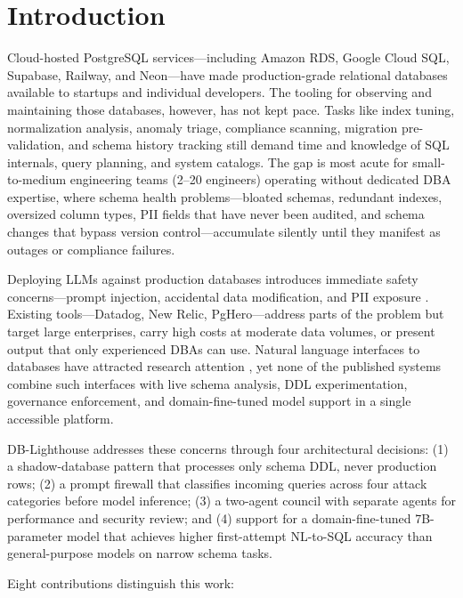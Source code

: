 \documentclass[conference]{IEEEtran}
\begin{document}
\section{Introduction}

Cloud-hosted PostgreSQL services---including Amazon RDS, Google Cloud
SQL, Supabase, Railway, and Neon---have made production-grade relational
databases available to startups and individual developers. The tooling
for observing and maintaining those databases, however, has not kept pace.
Tasks like index tuning, normalization analysis, anomaly triage, compliance
scanning, migration pre-validation, and schema history tracking still
demand time and knowledge of SQL internals, query planning,
and system catalogs. The gap is most acute for small-to-medium engineering teams (2--20
engineers) operating without dedicated DBA expertise, where schema health
problems---bloated schemas, redundant indexes, oversized column types, PII
fields that have never been audited, and schema changes that bypass version
control---accumulate silently until they manifest as outages or compliance
failures.

Deploying LLMs against production databases introduces immediate safety
concerns---prompt injection, accidental data modification, and PII
exposure \cite{perez2022ignore,greshake2023indirect}. Existing
tools---Datadog, New Relic, PgHero---address parts of the problem but
target large enterprises, carry high costs at moderate data volumes, or
present output that only experienced DBAs can use. Natural language
interfaces to databases have attracted research attention
\cite{li2023can,pourreza2024din,gao2023texttosql}, yet none of the
published systems combine such interfaces with live schema analysis, DDL
experimentation, governance enforcement, and domain-fine-tuned model
support in a single accessible platform.

DB-Lighthouse addresses these concerns through four architectural
decisions: (1) a shadow-database pattern that processes only schema DDL,
never production rows; (2) a prompt firewall that classifies incoming
queries across four attack categories before model inference; (3) a
two-agent council with separate agents for performance and security review;
and (4) support for a domain-fine-tuned 7B-parameter model that achieves
higher first-attempt NL-to-SQL accuracy than general-purpose models on
narrow schema tasks.

Eight contributions distinguish this work:
\end{document}
